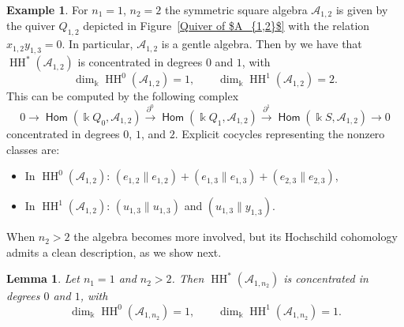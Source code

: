 \documentclass[a4paper, reqno, 11pt]{amsart}
\newtheorem{lemma}[theorem]{Lemma}
\theoremstyle{definition}
\newtheorem{example}[theorem]{Example}
\newcommand{\opname}[1]{\operatorname{\mathsf{#1}}}
\newcommand{\Hom}{\opname{Hom}}
\begin{document}
\begin{example}\label{ex: n_1=1,n_2=2}
	For $n_1=1$, $n_2=2$ the symmetric square algebra $\mathcal A_{1,2}$ is given by the quiver  $Q_{1,2}$ depicted in Figure~\ref{Quiver of $A_{1,2}$} with the relation $ x_{1,2} y_{1,3}=0.$ In particular, $\mathcal A_{1,2}$ is a gentle algebra.  Then by \cite{Chaparro-Schroll-SuarezAlvarez-Solotar2023} we have that $\operatorname{HH}^*(\mathcal{A}_{1,2})$ is concentrated in degrees $0$ and $1$, with
	\[
	\dim_{\Bbbk} \operatorname{HH}^0(\mathcal{A}_{1,2}) = 1,\qquad 
	\dim_{\Bbbk} \operatorname{HH}^1(\mathcal{A}_{1,2}) = 2.
	\]
	This can be computed by the following complex
	\begin{equation*}
		0 \to \Hom(\Bbbk Q_0, \mathcal{A}_{1,2}) \xrightarrow{\partial^0} \Hom(\Bbbk Q_1, \mathcal{A}_{1,2}) \xrightarrow{\partial^1} \Hom(\Bbbk S, \mathcal{A}_{1,2}) \to 0
	\end{equation*}
	concentrated in degrees $0$, $1$, and $2$. 
	Explicit cocycles representing the nonzero classes are:
	\begin{itemize}[leftmargin=*, label=--]
		\item In $\operatorname{HH}^0(\mathcal{A}_{1, 2})$: $(e_{1,2}\parallel e_{1,2})+(e_{1,3}\parallel e_{1,3})+(e_{2,3}\parallel e_{2,3})$,
		\item In $\operatorname{HH}^1(\mathcal{A}_{1, 2})$: $(u_{1,3} \parallel u_{1,3})$ and $(u_{1, 3} \parallel y_{1, 3})$.
	\end{itemize}
\end{example}



When $n_2>2$ the algebra becomes more involved, but its Hochschild cohomology admits a clean description, as we show next.

\begin{lemma}\label{lemma: HH of tilde A_{1,n_2}}
	Let $n_1 = 1$ and $n_2 > 2$. Then $\operatorname{HH}^*(\mathcal{A}_{1,n_2})$ is concentrated in degrees $0$ and $1$, with
	\[
	\dim_{\Bbbk} \operatorname{HH}^0(\mathcal{A}_{1, n_2}) = 1,\qquad 
	\dim_{\Bbbk} \operatorname{HH}^1(\mathcal{A}_{1, n_2}) = 1.
	\]
\end{lemma}
\end{document}
